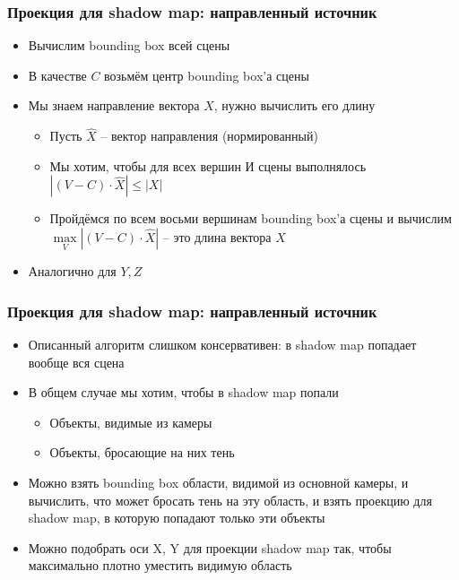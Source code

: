 \documentclass[10pt]{beamer}
\begin{document}
\begin{frame}[fragile]
\frametitle{Проекция для shadow map: направленный источник}
\begin{itemize}
\item Вычислим bounding box всей сцены
\pause
\item В качестве \begin{math}C\end{math} возьмём центр bounding box'а сцены
\pause
\item Мы знаем направление вектора \begin{math}X\end{math}, нужно вычислить его длину
\begin{itemize}
\item Пусть \begin{math}\hat X\end{math} -- вектор направления (нормированный)
\item Мы хотим, чтобы для всех вершин \begin{math}И\end{math} сцены выполнялось \begin{math}|(V - C) \cdot \hat X| \leq |X|\end{math}
\pause
\item Пройдёмся по всем восьми вершинам bounding box'а сцены и вычислим \begin{math}\max\limits_V |(V - C) \cdot \hat X|\end{math} -- это длина вектора \begin{math}X\end{math}
\end{itemize}
\pause
\item Аналогично для \begin{math}Y, Z\end{math}
\end{itemize}
\end{frame}

\begin{frame}[fragile]
\frametitle{Проекция для shadow map: направленный источник}
\begin{itemize}
\item Описанный алгоритм слишком консервативен: в shadow map попадает вообще вся сцена
\pause
\item В общем случае мы хотим, чтобы в shadow map попали
\pause
\begin{itemize}
\item Объекты, видимые из камеры
\pause
\item Объекты, бросающие на них тень
\end{itemize}
\pause
\item Можно взять bounding box области, видимой из основной камеры, и вычислить, что может бросать тень на эту область, и взять проекцию для shadow map, в которую попадают только эти объекты
\pause
\item Можно подобрать оси X, Y для проекции shadow map так, чтобы максимально плотно уместить видимую область
\end{itemize}
\end{frame}
\end{document}
